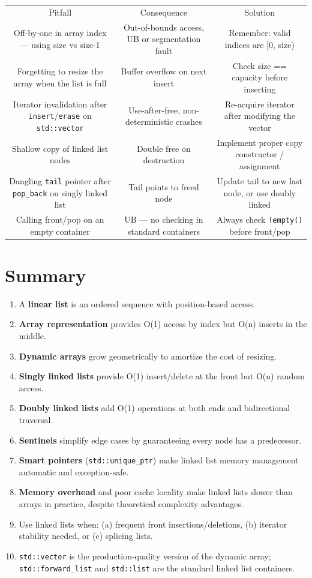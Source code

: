 \begin{center}
\begin{tabular}{ccc}
\toprule
Pitfall & Consequence & Solution \\
Off-by-one in array index — using size vs size-1 & Out-of-bounds access, UB or segmentation fault & Remember: valid indices are [0, size) \\
Forgetting to resize the array when the list is full & Buffer overflow on next insert & Check size == capacity before inserting \\
Iterator invalidation after \texttt{insert}/\texttt{erase} on \texttt{std::vector} & Use-after-free, non-deterministic crashes & Re-acquire iterator after modifying the vector \\
Shallow copy of linked list nodes & Double free on destruction & Implement proper copy constructor / assignment \\
Dangling \texttt{tail} pointer after \texttt{pop\_back} on singly linked list & Tail points to freed node & Update tail to new last node, or use doubly linked \\
Calling front/pop on an empty container & UB — no checking in standard containers & Always check \texttt{!empty()} before front/pop \\

\bottomrule
\end{tabular}
\end{center}
\section{Summary}

\begin{enumerate}
\item A \textbf{linear list} is an ordered sequence with position-based access.
\item \textbf{Array representation} provides O(1) access by index but O(n) inserts in the middle.
\item \textbf{Dynamic arrays} grow geometrically to amortize the cost of resizing.
\item \textbf{Singly linked lists} provide O(1) insert/delete at the front but O(n) random access.
\item \textbf{Doubly linked lists} add O(1) operations at both ends and bidirectional traversal.
\item \textbf{Sentinels} simplify edge cases by guaranteeing every node has a predecessor.
\item \textbf{Smart pointers} (\texttt{std::unique\_ptr}) make linked list memory management automatic and exception-safe.
\item \textbf{Memory overhead} and poor cache locality make linked lists slower than arrays in practice, despite theoretical complexity advantages.
\item Use linked lists when: (a) frequent front insertions/deletions, (b) iterator stability needed, or (c) splicing lists.
\item \texttt{std::vector} is the production-quality version of the dynamic array; \texttt{std::forward\_list} and \texttt{std::list} are the standard linked list containers.
\end{enumerate}

